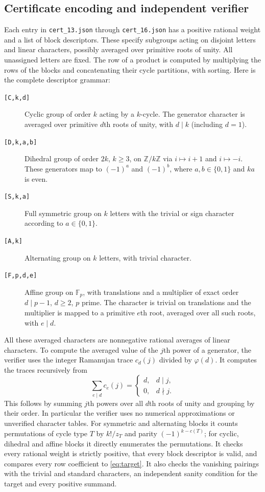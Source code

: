 \documentclass[11pt]{article}
\theoremstyle{remark}\newtheorem{remark}[theorem]{Remark}
\newcommand{\F}{\mathbb F}
\begin{document}
\subsection{Certificate encoding and independent verifier}
Each entry in \texttt{cert\_13.json} through \texttt{cert\_16.json} has a positive rational weight and a list of block descriptors. These specify subgroups acting on disjoint letters and linear characters, possibly averaged over primitive roots of unity. All unassigned letters are fixed. The row of a product is computed by multiplying the rows of the blocks and concatenating their cycle partitions, with sorting. Here is the complete descriptor grammar:
\begin{description}
\item[\texttt{[C,k,d]}] Cyclic group of order $k$ acting by a $k$-cycle. The generator character is averaged over primitive $d$th roots of unity, with $d\mid k$ (including $d=1$).
\item[\texttt{[D,k,a,b]}] Dihedral group of order $2k$, $k\ge3$, on $\mathbb Z/k\mathbb Z$ via $i\mapsto i+1$ and $i\mapsto-i$. These generators map to $(-1)^a$ and $(-1)^b$, where $a,b\in\{0,1\}$ and $ka$ is even.
\item[\texttt{[S,k,a]}] Full symmetric group on $k$ letters with the trivial or sign character according to $a\in\{0,1\}$.
\item[\texttt{[A,k]}] Alternating group on $k$ letters, with trivial character.
\item[\texttt{[F,p,d,e]}] Affine group on $\F_p$, with translations and a multiplier of exact order $d\mid p-1$, $d\ge2$, $p$ prime. The character is trivial on translations and the multiplier is mapped to a primitive $e$th root, averaged over all such roots, with $e\mid d$.
\end{description}

All these averaged characters are nonnegative rational averages of linear characters. To compute the averaged value of the $j$th power of a generator, the verifier uses the integer Ramanujan trace $c_d(j)$ divided by $\varphi(d)$. It computes the traces recursively from
\[
 \sum_{e\mid d}c_e(j)=\begin{cases}d,&d\mid j,\\0,&d\nmid j.\end{cases}
\]
This follows by summing $j$th powers over all $d$th roots of unity and grouping by their order. In particular the verifier uses no numerical approximations or unverified character tables. For symmetric and alternating blocks it counts permutations of cycle type $T$ by $k!/z_T$ and parity $(-1)^{k-c(T)}$; for cyclic, dihedral and affine blocks it directly enumerates the permutations. It checks every rational weight is strictly positive, that every block descriptor is valid, and compares every row coefficient to \eqref{eq:target}. It also checks the vanishing pairings with the trivial and standard characters, an independent sanity condition for the target and every positive summand.
\end{document}
